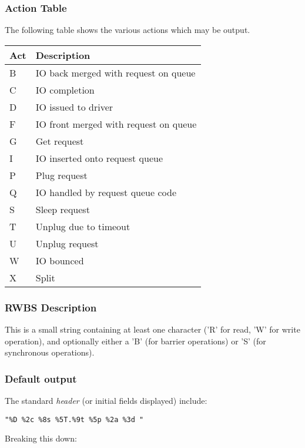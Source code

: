 \documentclass{article}
\begin{document}
\newpage
\subsubsection{\label{sec:act-table}Action Table}
The following table shows the various actions which may be output.

\begin{tabular}{|l|l|}\hline
Act & Description \\ \hline\hline
B & IO back merged with request on queue \\ \hline
C & IO completion \\ \hline
D & IO issued to driver \\ \hline
F & IO front merged with request on queue \\ \hline
G & Get request \\ \hline
I & IO inserted onto request queue \\ \hline
P & Plug request \\ \hline
Q & IO handled by request queue code \\ \hline
S & Sleep request \\ \hline
T & Unplug due to timeout \\ \hline
U & Unplug request \\ \hline
W & IO bounced \\ \hline
X & Split \\ \hline
\end{tabular}

\subsubsection{\label{sec:act-table}RWBS Description}
This is a small string containing at least one character ('R' for read,
'W' for write operation), and optionally either a 'B' (for barrier
operations) or 'S' (for synchronous operations).

\subsubsection{\label{sec:default-output}Default output}

The standard \emph{header} (or initial fields displayed) include:

\begin{verbatim}
"%D %2c %8s %5T.%9t %5p %2a %3d "
\end{verbatim}

Breaking this down:
\end{document}
